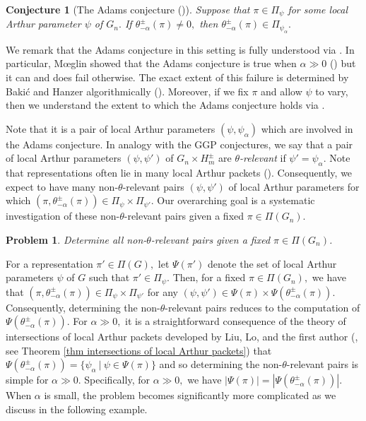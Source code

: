 \documentclass[11pt,letterpaper]{amsart}
\newtheorem{conj}[thm]{Conjecture}
\newtheorem{prob}[thm]{Problem}
\numberwithin{equation}{section}
\begin{document}
\begin{conj}[The Adams conjecture {(\cite{Ada89})}]\label{conj Adams intro}
    Suppose that $\pi\in\Pi_\psi$ for some local Arthur parameter $\psi$ of $G_n.$ If $\theta_{-\alpha}^\pm(\pi)\neq 0,$ then $\theta_{-\alpha}^\pm(\pi)\in\Pi_{\psi_\alpha}.$
\end{conj}

We remark that the Adams conjecture in this setting is fully understood via \cite{BH22, Moe11c}. In particular, M{\oe}glin showed that the Adams conjecture is true when $\alpha\gg0$ (\cite[Theorem 6.1]{Moe11c}) but it can and does fail otherwise. The exact extent of this failure is determined by Baki{\'c} and Hanzer algorithmically (\cite[Theorem A]{BH22}).
Moreover, if we fix $\pi$ and allow $\psi$ to vary, then we understand the extent to which the Adams conjecture holds via \cite[Theorem 1.3]{Haz24}.

Note that it is a pair of local Arthur parameters $(\psi,\psi_\alpha)$ which are involved in the Adams conjecture. In analogy with the GGP conjectures, we say that a pair of local Arthur parameters $(\psi,\psi')$ of $G_n\times H_m^\pm$ are \emph{$\theta$-relevant} if $\psi'=\psi_\alpha.$ Note that representations often lie in many local Arthur packets (\cite{Ato23, HLL22, HLL25}). Consequently, we expect to have many non-$\theta$-relevant pairs $(\psi,\psi')$ of local Arthur parameters for which $(\pi,\theta_{-\alpha}^\pm(\pi))\in\Pi_\psi\times\Pi_{\psi'}$. Our overarching goal is a systematic investigation of these non-$\theta$-relevant pairs given a fixed $\pi\in\Pi(G_n)$.

\begin{prob}\label{prob non theta relevant}
    Determine all non-$\theta$-relevant pairs given a fixed $\pi\in\Pi(G_n)$.
\end{prob}

For a representation $\pi'\in\Pi(G),$ let $\Psi(\pi')$ denote the set of local Arthur parameters $\psi$ of $G$ such that $\pi'\in\Pi_\psi.$ Then, for a fixed $\pi\in\Pi(G_n),$ we have that $(\pi,\theta_{-\alpha}^\pm(\pi))\in\Pi_\psi\times\Pi_{\psi'}$ for any $(\psi,\psi')\in\Psi(\pi)\times\Psi(\theta_{-\alpha}^\pm(\pi)).$  Consequently, determining the non-$\theta$-relevant pairs reduces to the computation of $\Psi(\theta_{-\alpha}^\pm(\pi)).$ For $\alpha\gg0,$ it is a straightforward consequence of the theory of intersections of local Arthur packets developed by Liu, Lo, and the first author (\cite{HLL22, HLL25}, see Theorem \ref{thm intersections of local Arthur packets}) that $\Psi(\theta_{-\alpha}^\pm(\pi))=\{\psi_\alpha \ | \ \psi\in\Psi(\pi)\}$ and so determining the non-$\theta$-relevant pairs is simple for $\alpha\gg0$. Specifically, for $\alpha\gg0,$ we have $|\Psi(\pi)|=|\Psi(\theta_{-\alpha}^\pm(\pi))|$. When $\alpha$ is small, the problem becomes significantly more complicated as we discuss in the following example.
\end{document}
